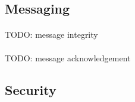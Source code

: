 \documentclass[a4paper, 11pt]{article}
\begin{document}
\subsection{Messaging}
\paragraph{}


\paragraph{}
TODO: message integrity

\paragraph{}
TODO: message acknowledgement


\subsection{Security}
\paragraph{}



\end{document}
